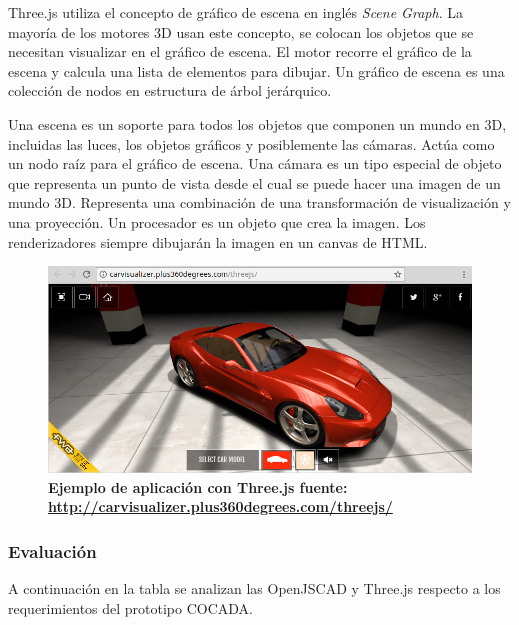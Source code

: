 Three.js utiliza el concepto de gráfico de escena en inglés \textit{Scene Graph}. La mayoría de los motores 3D usan este concepto, se colocan los objetos que se necesitan visualizar en el gráfico de escena. El motor recorre el gráfico de la escena y calcula una lista de elementos para dibujar. Un gráfico de escena es una colección de nodos en estructura de árbol jerárquico.

Una escena es un soporte para todos los objetos que componen un mundo en 3D, incluidas las luces, los objetos gráficos y posiblemente las cámaras. Actúa como un nodo raíz para el gráfico de escena. Una cámara es un tipo especial de objeto que representa un punto de vista desde el cual se puede hacer una imagen de un mundo 3D. Representa una combinación de una transformación de visualización y una proyección. Un procesador es un objeto que crea la imagen. Los renderizadores siempre dibujarán la imagen en un canvas de HTML.

\begin{figure}[h]
\includegraphics[width=15cm]{Img/WEB/web-three.jpg}
\centering
\caption{\textbf{\footnotesize{Ejemplo de aplicación con Three.js fuente: \url{http://carvisualizer.plus360degrees.com/threejs/} }}}
\label{fig:threejs}
\end{figure}

\clearpage
\subsubsection{Evaluación}

A continuación en la tabla se analizan las OpenJSCAD y Three.js respecto a los requerimientos del prototipo COCADA.

